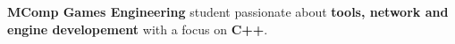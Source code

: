 \vspace*{-5mm}
\noindent
\begin{center}
    \textbf{MComp Games Engineering} student passionate about \textbf{tools, network and engine developement} with a focus on \textbf{C++}.
\end{center}
